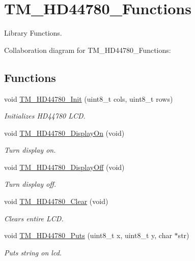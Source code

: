 \hypertarget{group___t_m___h_d44780___functions}{}\section{T\+M\+\_\+\+H\+D44780\+\_\+\+Functions}
\label{group___t_m___h_d44780___functions}


Library Functions.  


Collaboration diagram for T\+M\+\_\+\+H\+D44780\+\_\+\+Functions\+:
\subsection*{Functions}
\begin{DoxyCompactItemize}
\item 
void \hyperlink{group___t_m___h_d44780___functions_ga95ddcfeff8a1e3979f453e3e87164a37}{T\+M\+\_\+\+H\+D44780\+\_\+\+Init} (uint8\+\_\+t cols, uint8\+\_\+t rows)
\begin{DoxyCompactList}\small\item\em Initializes H\+D44780 L\+CD. \end{DoxyCompactList}\item 
void \hyperlink{group___t_m___h_d44780___functions_ga2f61b153a32e30c63a67888cf8e0ee86}{T\+M\+\_\+\+H\+D44780\+\_\+\+Display\+On} (void)
\begin{DoxyCompactList}\small\item\em Turn display on. \end{DoxyCompactList}\item 
void \hyperlink{group___t_m___h_d44780___functions_ga72f1b22b97fd06cc7e64fc743b16b492}{T\+M\+\_\+\+H\+D44780\+\_\+\+Display\+Off} (void)
\begin{DoxyCompactList}\small\item\em Turn display off. \end{DoxyCompactList}\item 
void \hyperlink{group___t_m___h_d44780___functions_ga0a7a99ba13104c13646bbb40e5ee3bd9}{T\+M\+\_\+\+H\+D44780\+\_\+\+Clear} (void)
\begin{DoxyCompactList}\small\item\em Clears entire L\+CD. \end{DoxyCompactList}\item 
void \hyperlink{group___t_m___h_d44780___functions_ga67a3b90f620284520a052c20fab4ee3e}{T\+M\+\_\+\+H\+D44780\+\_\+\+Puts} (uint8\+\_\+t x, uint8\+\_\+t y, char $\ast$str)
\begin{DoxyCompactList}\small\item\em Puts string on lcd. \end{DoxyCompactList}\item 

\end{DoxyCompactItemize}
